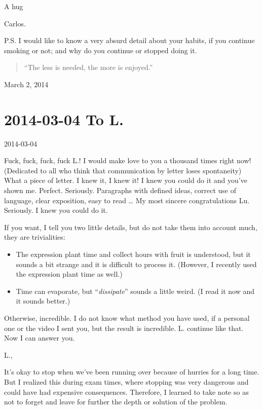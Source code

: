 \documentclass[]{book}
\begin{document}
A hug

Carlos.

P.S. I would like to know a very absurd detail about your habits, if you continue smoking or not; and why do you continue or stopped doing it.

\begin{quote}
``The less is needed, the more is enjoyed.''
\end{quote}

March 2, 2014

\hypertarget{toL20140304}{%
\section*{2014-03-04 To L.}\label{toL20140304}}

2014-03-04

Fuck, fuck, fuck, fuck L.! I would make love to you a thousand times right now! (Dedicated to all who think that communication by letter loses spontaneity) What a piece of letter. I knew it, I knew it! I knew you could do it and you've shown me. Perfect. Seriously. Paragraphs with defined ideas, correct use of language, clear exposition, easy to read \ldots{} My most sincere congratulations Lu. Seriously. I knew you could do it.

If you want, I tell you two little details, but do not take them into account much, they are trivialities:

\begin{itemize}
\item
  The expression plant time and collect hours with fruit is understood, but it sounds a bit strange and it is difficult to process it. (However, I recently used the expression plant time as well.)
\item
  Time can evaporate, but ``\emph{dissipate}'' sounds a little weird. (I read it now and it sounds better.)
\end{itemize}

Otherwise, incredible. I do not know what method you have used, if a personal one or the video I sent you, but the result is incredible. L. continue like that. Now I can answer you.

L.,

It's okay to stop when we've been running over because of hurries for a long time. But I realized this during exam times, where stopping was very dangerous and could have had expensive consequences. Therefore, I learned to take note so as not to forget and leave for further the depth or solution of the problem.
\end{document}

